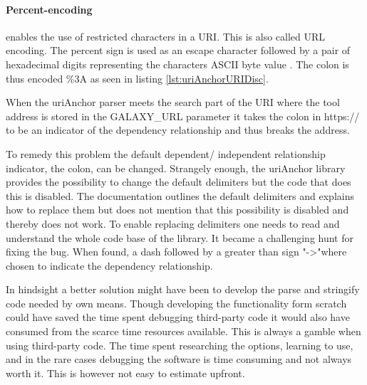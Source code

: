 \documentclass[english]{ifimaster}
\begin{document}
\paragraph{Percent-encoding} enables the use of restricted characters in a URI. This is also called URL encoding. The percent sign is used as an escape character followed by a pair of hexadecimal digits representing the characters ASCII byte value \parencite{urlencode}. The colon is thus encoded \%3A as seen in listing \ref{lst:uriAnchorURIDisc}.

When the uriAnchor parser meets the search part of the URI where the tool address is stored in the GALAXY\_URL parameter it takes the colon in https:// to be an indicator of the dependency relationship and thus breaks the address.

To remedy this problem the default dependent/ independent relationship indicator, the colon, can be changed. Strangely enough, the uriAnchor library provides the possibility to change the default delimiters but the code that does this is disabled. The documentation outlines the default delimiters and explains how to replace them but does not mention that this possibility is disabled and thereby does not work. To enable replacing delimiters one needs to read and understand the whole code base of the library. It became a challenging hunt for fixing the bug. When found, a dash followed by a greater than sign "->"where chosen to indicate the dependency relationship.

In hindsight a better solution might have been to develop the parse and stringify code needed by own means. Though developing the functionality form scratch could have saved the time spent debugging third-party code it would also have consumed from the scarce time resources available. This is always a gamble when using third-party code. The time spent researching the options, learning to use, and in the rare cases debugging the software is time consuming and not always worth it. This is however not easy to estimate upfront.
\end{document}
